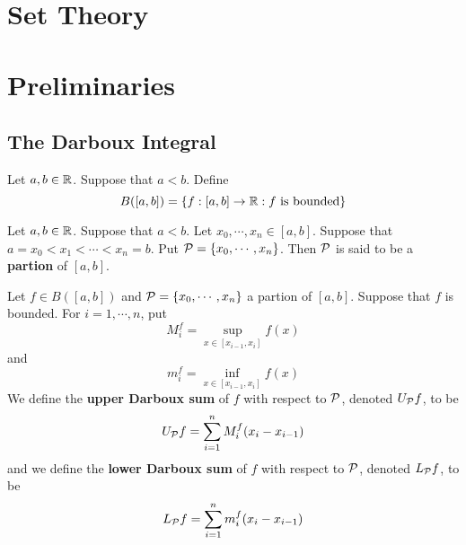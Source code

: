 \documentclass{book}
\begin{document}
	
	
	
	
	
	
	
	
	
	
	
	
	
	
	\chapter{Set Theory}
	
	
	
	
	
	
	
	
	
	
	
	
	
	
	
	
	
	
	
	
	
	
	
	
	
	
	
	
	
	
	
	
	
	
	
	
	
	
	
	
	
	
	
	\newpage
	\chapter{Preliminaries}
	
	\section{The Darboux Integral}
	
	\begin{defn}  
		Let $a,b \in \mathbb{R}$. Suppose that $a<b$. Define $$B([a,b]) = \{f:[a,b] \rightarrow \mathbb{R}: f\text{ is bounded}\}$$
	\end{defn}
	
	\begin{defn}  
		Let $a,b \in \mathbb{R}$. Suppose that $a<b$. Let $x_0, \cdots, x_n \in [a,b]$. Suppose that $a= x_0 < x_1 < \cdots < x_n = b$. Put $\mathcal{P} = \{x_0, \cdots, x_n\}$. Then $\mathcal{P}$ is said to be a \textbf{partion} of $[a,b]$. 
	\end{defn}
	
	\begin{defn}  
		Let $f \in B([a,b])$ and $\mathcal{P} = \{x_0, \cdots, x_n\}$ a partion of $[a,b]$. Suppose that $f$ is bounded. For $i = 1, \cdots, n$, put 
		$$M^f_i = \sup_{x \in [x_{i-1}, x_i]} f(x)$$ and 
		$$m^f_i = \inf_{x \in [x_{i-1}, x_i]} f(x)$$ 
		We define the \textbf{upper Darboux sum} of $f$ with respect to $\mathcal{P}$, denoted $U_{\mathcal{P}} f$, to be $$U_{\mathcal{P}} f = \sum_{i=1}^n M^f_i (x_i - x_{i-1})$$ 
		and we define the \textbf{lower Darboux sum} of $f$ with respect to $\mathcal{P}$, denoted $L_{\mathcal{P}} f$, to be
		$$L_{\mathcal{P}} f = \sum_{i=1}^n m^f_i (x_i - x_{i-1})$$ 
	\end{defn}
\end{document}
